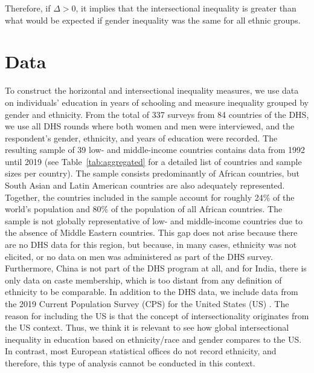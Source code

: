 Therefore, if $\Delta > 0$, it implies that the intersectional inequality is greater than what would be expected if gender inequality was the same for all ethnic groups.
 
\hypertarget{data}{%
\section{Data}\label{sec:data_ed}}

To construct the horizontal and intersectional inequality measures, we use data on individuals' education in years of schooling and measure inequality grouped by gender and ethnicity. From the total of 337 surveys from 84 countries of the DHS, we use all DHS rounds where both women and men were interviewed, and the respondent's gender, ethnicity, and years of education were recorded. The resulting sample of 39 low- and middle-income countries contains data from 1992 until 2019 (see Table~\ref{tab:aggregated} for a detailed list of countries and sample sizes per country). The sample consists predominantly of African countries, but South Asian and Latin American countries are also adequately represented. Together, the countries included in the sample account for roughly 24\% of the world's population and 80\% of the population of all African countries. The sample is not globally representative of low- and middle-income countries due to the absence of Middle Eastern countries. This gap does not arise because there are no DHS data for this region, but because, in many cases, ethnicity was not elicited, or no data on men was administered as part of the DHS survey. Furthermore, China is not part of the DHS program at all, and for India, there is only data on caste membership, which is too distant from any definition of ethnicity to be comparable. In addition to the DHS data, we include data from the 2019 Current Population Survey (CPS) for the United States (US) \citep{Flood2021}. The reason for including the US is that the concept of intersectionality originates from the US context. Thus, we think it is relevant to see how global intersectional inequality in education based on ethnicity/race and gender compares to the US. In contrast, most European statistical offices do not record ethnicity, and therefore, this type of analysis cannot be conducted in this context.

